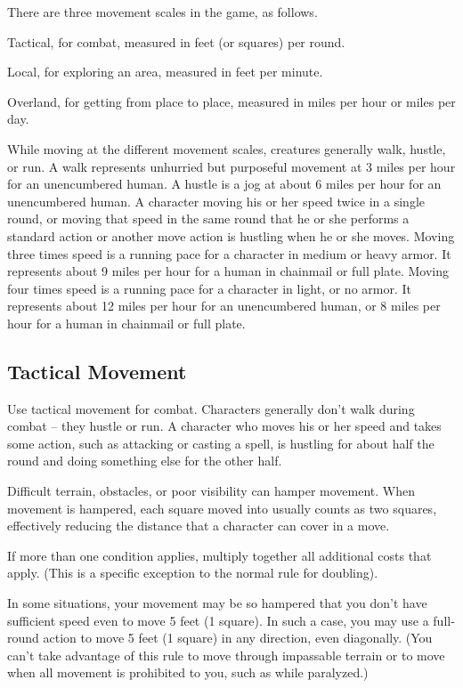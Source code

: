 There are three movement scales in the game, as follows.
\begin{itemize*}
\item Tactical, for combat, measured in feet (or squares) per round.
\item Local, for exploring an area, measured in feet per minute.
\item Overland, for getting from place to place, measured in miles per
hour or miles per day.
\end{itemize*}

 While moving at the different movement scales, creatures generally walk, hustle, or run.
 A walk represents unhurried but purposeful movement at 3 miles per hour for an unencumbered human.
 A hustle is a jog at about 6 miles per hour for an unencumbered human. A character moving his or her
speed twice in a single round, or moving that speed in the same round that he or she performs a standard action or another move action is hustling when he or she moves.
 Moving three times speed is a running pace for a character in medium or heavy armor. It represents about 9 miles per hour for a human in chainmail or full plate.
 Moving four times speed is a running pace for a character in light, or no armor. It represents about 12 miles per hour for an unencumbered human, or 8 miles per hour for a human in chainmail or full plate.

\subsection{Tactical Movement}
Use tactical movement for combat. Characters generally don't walk during combat -- they hustle or run. A character who
moves his or her speed and takes some action, such as attacking or casting a spell, is hustling for about half the round and doing something else for the other half.

 Difficult terrain, obstacles, or poor visibility can hamper movement. When movement is
hampered, each square moved into usually counts as two squares, effectively reducing the distance that a character
can cover in a move.

If more than one condition applies, multiply together all additional costs that apply. (This is a specific exception to the normal rule for doubling).

In some situations, your movement may be so hampered that you don't have sufficient speed even to move 5 feet (1 square). In such a case, you may use a full-round action to move 5 feet (1 square) in any direction, even diagonally. (You can't take advantage of this rule to move through impassable terrain or to move when all movement is prohibited to you, such as while paralyzed.)

